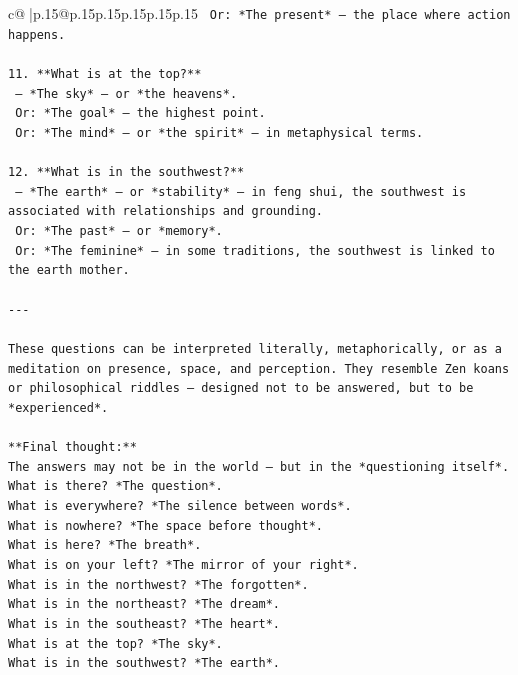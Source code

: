 \documentclass{article}
\begin{document}
{\begin{supertabular}{c@{$\;$}|p{.15\linewidth}@{}p{.15\linewidth}p{.15\linewidth}p{.15\linewidth}p{.15\linewidth}p{.15\linewidth}}
{{{\texttt{   Or: *The present* — the place where action happens.} \\
\\ 
\texttt{11. **What is at the top?**  } \\
\texttt{   — *The sky* — or *the heavens*.  } \\
\texttt{   Or: *The goal* — the highest point.  } \\
\texttt{   Or: *The mind* — or *the spirit* — in metaphysical terms.} \\
\\ 
\texttt{12. **What is in the southwest?**  } \\
\texttt{   — *The earth* — or *stability* — in feng shui, the southwest is associated with relationships and grounding.  } \\
\texttt{   Or: *The past* — or *memory*.  } \\
\texttt{   Or: *The feminine* — in some traditions, the southwest is linked to the earth mother.} \\
\\ 
\texttt{{-}{-}{-}} \\
\\ 
\texttt{These questions can be interpreted literally, metaphorically, or as a meditation on presence, space, and perception. They resemble Zen koans or philosophical riddles — designed not to be answered, but to be *experienced*.} \\
\\ 
\texttt{**Final thought:**  } \\
\texttt{The answers may not be in the world — but in the *questioning itself*.  } \\
\texttt{What is there? *The question*.  } \\
\texttt{What is everywhere? *The silence between words*.  } \\
\texttt{What is nowhere? *The space before thought*.  } \\
\texttt{What is here? *The breath*.  } \\
\texttt{What is on your left? *The mirror of your right*.  } \\
\texttt{What is in the northwest? *The forgotten*.  } \\
\texttt{What is in the northeast? *The dream*.  } \\
\texttt{What is in the southeast? *The heart*.  } \\
\texttt{What is at the top? *The sky*.  } \\
\texttt{What is in the southwest? *The earth*.  } \\
}}}
\end{supertabular}}
\end{document}
